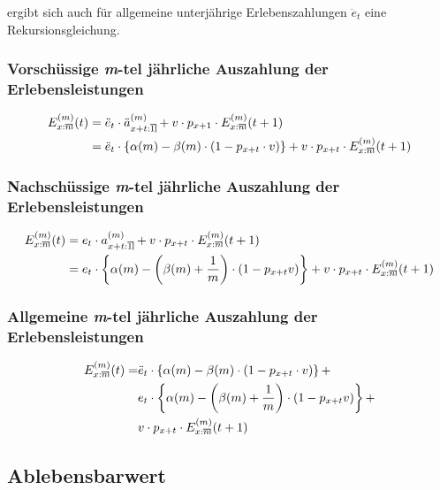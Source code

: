 \documentclass[a4paper,10pt]{article}
\makeatletter
\newcommand{\xn}{{\act[x]{n}}}
\DeclareRobustCommand{\act}[2][]{%
\def\arraystretch{0}%
\setlength\arraycolsep{0.5pt}%
\setlength\arrayrulewidth{0.5pt}%
\setbox0=\hbox{$\scriptstyle#1\ifx#1\empty{asdf}\else:\fi#2$}%
\begin{array}[b]{*2{@{}>{\scriptstyle}c}|}
\cline{2-2}%
\rule[1.25pt]{0pt}{\ht0}%
#1\ifx#1\empty\else:\fi & #2%
\end{array}%
}
\makeatother
\begin{document}
ergibt sich auch für allgemeine unterjährige Erlebenszahlungen $\ddot{e}_t$ eine Rekursionsgleichung.

\subsubsection{Vorschüssige \textit{m}-tel jährliche Auszahlung der Erlebensleistungen}


\begin{align*}
E^{(m)}_\xn(t) &= \ddot{e}_t \cdot \ddot{a}_{\act[x+t]{1}}^{(m)} + v \cdot p_{x+1} \cdot E^{(m)}_\xn(t+1)\\
  &= \ddot{e}_t \cdot \left\{\alpha(m)  - \beta(m) \cdot \left(1-p_{x+t} \cdot v\right)\right\} + v\cdot p_{x+t} \cdot E^{(m)}_\xn(t+1)
\end{align*}


\subsubsection{Nachschüssige \textit{m}-tel jährliche Auszahlung der Erlebensleistungen}

\begin{align*}
E^{(m)}_\xn(t) &= e_t \cdot a_{\act[x+t]{1}}^{(m)} + v \cdot p_{x+t} \cdot E^{(m)}_\xn(t+1)\\
   &= e_t\cdot\left\{\alpha(m) - \left(\beta(m)+\frac1m\right)\cdot\left(1-p_{x+t} v\right)\right\} + v\cdot p_{x+t} \cdot E^{(m)}_\xn(t+1)
\end{align*}

\subsubsection{Allgemeine \textit{m}-tel jährliche Auszahlung der Erlebensleistungen}


\begin{align*}
E^{(m)}_\xn(t) = &\ddot{e}_t \cdot \left\{\alpha(m)  - \beta(m) \cdot \left(1-p_{x+t} \cdot v\right)\right\} +  \\
 &e_t\cdot\left\{\alpha(m) - \left(\beta(m)+\frac1m\right)\cdot\left(1-p_{x+t} v\right)\right\} + \\
 &v\cdot p_{x+t} \cdot E^{(m)}_\xn(t+1)
\end{align*}




\subsection{Ablebensbarwert}
\end{document}
